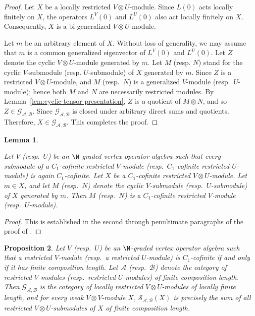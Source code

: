 \documentclass[12pt, english]{article}
\numberwithin{equation}{section}
\theoremstyle{plain}
\newtheorem{lemma}{Lemma}[section]
\newtheorem{proposition}[lemma]{Proposition}
\theoremstyle{definition}
\theoremstyle{remark}
\begin{document}
\begin{proof}
		Let $X$ be a locally restricted $V\otimes U$-module.
		Since $L(0)$ acts locally finitely on $X$, the operators $L^V(0)$ and $L^U(0)$ also act locally finitely on $X$.
		Consequently, $X$ is a bi-generalized $V \otimes U$-module.
		
		Let $m$ be an arbitrary element of $X$. Without loss of generality,
		we may assume that $m$ is a common generalized eigenvector of $L^V(0)$ and $L^U(0)$.
		Let $Z$ denote the cyclic $V\otimes U$-module generated by $m$.
		Let $M$ (resp. $N$) stand for the cyclic $V$-submodule (resp. $U$-submodule) of $X$ generated by $m$.
		Since $Z$ is a restricted $V\otimes U$-module, and $M$ (resp.\ $N$) is a generalized $V$-module (resp.\ $U$-module);
		hence both $M$ and $N$ are necessarily restricted modules.
		By Lemma~\ref{lem:cyclic-tensor-presentation}, $Z$ is a quotient of $M\otimes N$, and so $Z \in \mathcal{G}_{\mathcal{A}, \mathcal{B}}$.
		Since $\mathcal{G}_{\mathcal{A}, \mathcal{B}}$ is closed under arbitrary direct sums and quotients.
		Therefore, $X \in \mathcal{G}_{\mathcal{A}, \mathcal{B}}$.
		This completes the proof.
		
	\end{proof}
	
	\begin{lemma} \label{lem:c1-cofinite-cyclic-factors}
		
		Let $V$ (resp.\ $U$) be an $\N$-graded vertex operator algebra such that every submodule of a $C_1$-cofinite restricted $V$-module (resp.\ $C_1$-cofinite restricted $U$-module) is again $C_1$-cofinite.
		Let $X$ be a $C_1$-cofinite restricted $V\otimes U$-module.
		Let $m \in X$, and let $M$ (resp.\ $N$) denote the cyclic $V$-submodule (resp.\ $U$-submodule) of $X$ generated by $m$.
		Then $M$ (resp.\ $N$) is a $C_1$-cofinite restricted $V$-module (resp.\ $U$-module).
		
	\end{lemma}
	
	\begin{proof}
		This is established in the second through penultimate paragraphs of the proof of \cite[Theorem 3.7]{McR23}.
		
	\end{proof}
	
	\begin{proposition} \label{prop:generated-locally-finite-length-modules}
		Let $V$ (resp.\ $U$) be an $\N$-graded vertex operator algebra such that
		a restricted $V$-module (resp.\ a restricted $U$-module) is $C_1$-cofinite
		if and only if it has finite composition length.
		Let $\mathcal{A}$ (resp.\ $\mathcal{B}$) denote the category of restricted $V$-modules (resp.\ restricted $U$-modules) of finite composition length.
		Then $\mathcal{G}_{\mathcal{A}, \mathcal{B}}$ is the category of locally restricted $V\otimes U$-modules of locally finite length, and  for every weak $V \otimes V$-module $X$, $\mathcal{S}_{\mathcal{A}, \mathcal{B}}(X)$ is precisely the sum of all restricted $V\otimes U$-submodules of $X$ of finite composition length.
	\end{proposition}
	
\end{document}
